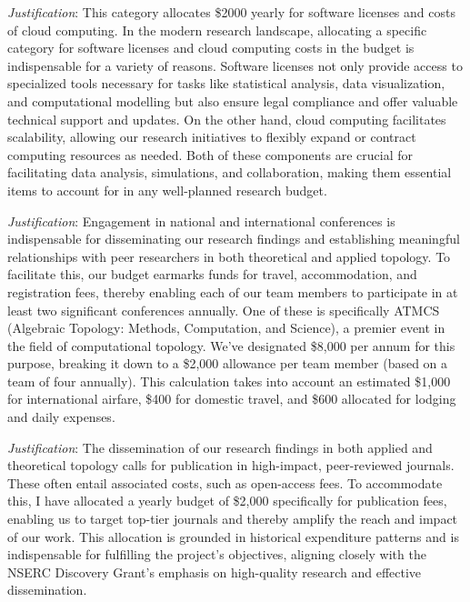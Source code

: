 \documentclass[12pt]{article}
\begin{document}
	\newpage
	\medskip

	\noindent\textit{Justification}:
	This category allocates \$2000 yearly for software licenses and costs of cloud computing.
	In the modern research landscape, allocating a specific category for software licenses and cloud computing costs in the budget is indispensable for a variety of reasons. Software licenses not only provide access to specialized tools necessary for tasks like statistical analysis, data visualization, and computational modelling but also ensure legal compliance and offer valuable technical support and updates. On the other hand, cloud computing facilitates scalability, allowing our research initiatives to flexibly expand or contract computing resources as needed. Both of these components are crucial for facilitating data analysis, simulations, and collaboration, making them essential items to account for in any well-planned research budget.

	\medskip

	\noindent\textit{Justification}:
	Engagement in national and international conferences is indispensable for disseminating our research findings and establishing meaningful relationships with peer researchers in both theoretical and applied topology. To facilitate this, our budget earmarks funds for travel, accommodation, and registration fees, thereby enabling each of our team members to participate in at least two significant conferences annually. One of these is specifically ATMCS (Algebraic Topology: Methods, Computation, and Science), a premier event in the field of computational topology. We've designated \$8,000 per annum for this purpose, breaking it down to a \$2,000 allowance per team member (based on a team of four annually). This calculation takes into account an estimated \$1,000 for international airfare, \$400 for domestic travel, and \$600 allocated for lodging and daily expenses.

	\medskip

	\noindent\textit{Justification}:
	The dissemination of our research findings in both applied and theoretical topology calls for publication in high-impact, peer-reviewed journals. These often entail associated costs, such as open-access fees. To accommodate this, I have allocated a yearly budget of \$2,000 specifically for publication fees, enabling us to target top-tier journals and thereby amplify the reach and impact of our work. This allocation is grounded in historical expenditure patterns and is indispensable for fulfilling the project's objectives, aligning closely with the NSERC Discovery Grant's emphasis on high-quality research and effective dissemination.
\end{document}
